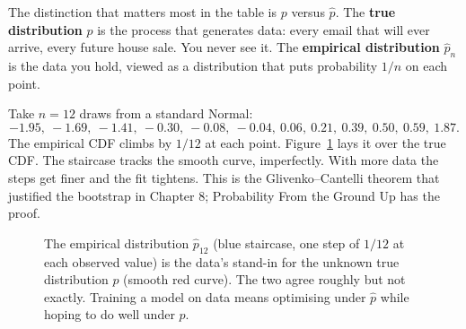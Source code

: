 The distinction that matters most in the table is $p$ versus $\hat p$. The \textbf{true
distribution} $p$ is the process that generates data: every email that will ever arrive,
every future house sale. You never see it. The \textbf{empirical distribution} $\hat p_n$ is
the data you hold, viewed as a distribution that puts probability $1/n$ on each
point.

Take $n=12$ draws from a standard Normal:
\[
-1.95,\ -1.69,\ -1.41,\ -0.30,\ -0.08,\ -0.04,\ 0.06,\ 0.21,\ 0.39,\ 0.50,\ 0.59,\ 1.87.
\]
The empirical CDF climbs by $1/12$ at each point. Figure~\ref{fig:ml-ecdf} lays it over the
true CDF. The staircase tracks the smooth curve, imperfectly. With more data the steps get
finer and the fit tightens. This is the Glivenko--Cantelli theorem that justified the
bootstrap in Chapter 8; Probability From the Ground Up has the proof.

\begin{figure}[H]
\centering
{}
\caption{The empirical distribution $\hat p_{12}$ (blue staircase, one step of $1/12$ at each
observed value) is the data's stand-in for the unknown true distribution $p$ (smooth red
curve). The two agree roughly but not exactly. Training a model on data means optimising
under $\hat p$ while hoping to do well under $p$.}
\label{fig:ml-ecdf}
\end{figure}

